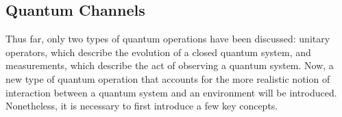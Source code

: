 







\subsection{Quantum Channels} \label{subsec:quantum_channels}


Thus far, only two types of quantum operations have been discussed: unitary operators, which describe the evolution of a closed quantum system, and measurements, which describe the act of observing a quantum system. Now, a new type of quantum operation that accounts for the more realistic notion of interaction between a quantum system and an environment will be introduced. Nonetheless, it is necessary to first introduce a few key concepts.



